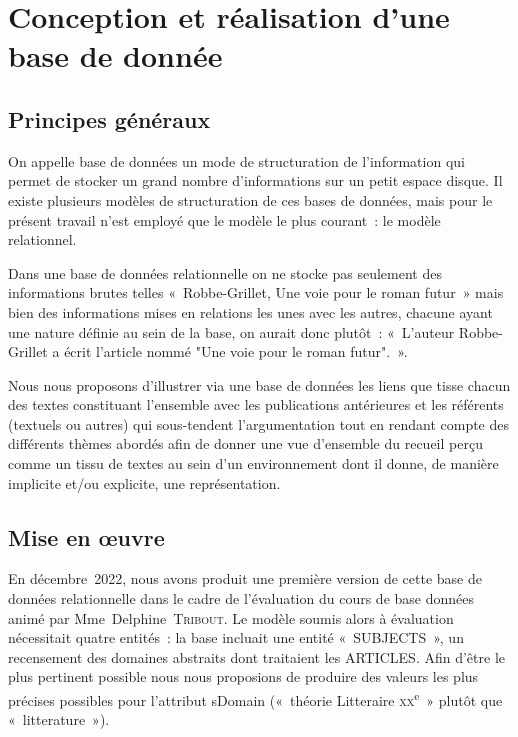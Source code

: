 \documentclass[12pt, a4paper]{article}
\begin{document}
\section{Conception et réalisation d'une base de donnée}
    \subsection{Principes généraux}
    On appelle base de données un mode de structuration de l'information qui permet de stocker un grand nombre d'informations sur un petit espace disque. Il existe plusieurs modèles de structuration de ces bases de données, mais pour le présent travail n'est employé que le modèle le plus courant~: le modèle relationnel.

    Dans une base de données relationnelle on ne stocke pas seulement des informations brutes telles «~Robbe-Grillet, Une voie pour le roman futur~» mais bien des informations mises en relations les unes avec les autres, chacune ayant une nature définie au sein de la base, on aurait donc plutôt~: «~L'auteur Robbe-Grillet a écrit l'article nommé "Une voie pour le roman futur".~».

    Nous nous proposons d'illustrer via une base de données les liens que tisse chacun des textes constituant l'ensemble avec les publications antérieures et les référents (textuels ou autres) qui sous-tendent l'argumentation tout en rendant compte des différents thèmes abordés afin de donner une vue d'ensemble du recueil perçu comme un tissu de textes au sein d'un environnement dont il donne, de manière implicite et/ou explicite, une représentation.


   




    \subsection{Mise en œuvre}

    En décembre~2022, nous avons produit une première version de cette base de données relationnelle dans le cadre de l'évaluation du cours de base données animé par Mme~Delphine~\textsc{Tribout}. Le modèle soumis alors à évaluation nécessitait quatre entités~: la base incluait une entité «~SUBJECTS~», un recensement des domaines abstraits dont traitaient les ARTICLES. Afin d'être le plus pertinent possible nous nous proposions de produire des valeurs les plus précises possibles pour l'attribut sDomain («~théorie Litteraire \textsc{xx}\textsuperscript{e}~» plutôt que «~litterature~»).
\end{document}
